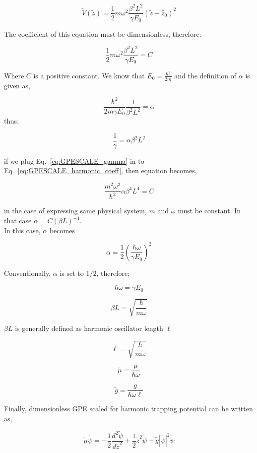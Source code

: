 \documentclass[a4paper,times,hidelinks,12pt]{article}
\begin{document}
\begin{equation}
\label{eq:GPESCALE_harmonic_energy_transform}
    \widetilde{V}(\widetilde{z}) = \frac{1}{2} m\omega^2 \frac{\beta^2 L^2}{\gamma E_0} (\widetilde{z}-\widetilde{z_0})^2  
\end{equation}

The coefficient of this equation must be dimensionless, therefore;

\begin{equation}
\label{eq:GPESCALE_harmonic_coeff}
    \frac{1}{2} m\omega^2 \frac{\beta^2 L^2}{\gamma E_0} = C
\end{equation}

Where $C$ is a positive constant. We know that $E_0 = \frac{\hbar^2}{2m}$ and the definition of $\alpha$ is given as,

\begin{equation}
\label{eq:GPESCALE_alpha}
    \frac{\hbar^2}{2m\gamma E_0} \frac{1}{\beta^2 L^2} = \alpha
\end{equation}
thus;

\begin{equation}
\label{eq:GPESCALE_gamma}
     \frac{1}{\gamma} = \alpha \beta^2 L^2
\end{equation}

if we plug Eq.~\eqref{eq:GPESCALE_gamma} in to Eq.~\eqref{eq:GPESCALE_harmonic_coeff}, then equation becomes,

\begin{equation}
\label{eq:GPESCALE_harmonic_coeff_2}
    \frac{m^2\omega^2}{\hbar^2} \alpha \beta^4 L^4 = C 
\end{equation} 

in the case of expressing same physical system, $m$ and $\omega$ must be constant. In that case $\alpha = C (\beta L)^{-4}$.\\


In this case, $\alpha$ becomes

$$ \alpha =  \frac{1}{2} \left(\frac{\hbar \omega}{\gamma E_0}\right)^2 $$

Conventionally, $\alpha$ is set to $1/2$, therefore;

$$ \hbar \omega = \gamma E_0 $$

$$ \beta L = \sqrt{\frac{\hbar}{m\omega}} $$ 

$ \beta L $ is generally defined as harmonic oscillator length $\ell$

$$ \ell = \sqrt{\frac{\hbar}{m\omega}} $$ 

$$ \widetilde{\mu} = \frac{\mu}{\hbar \omega} $$ 

$$ \widetilde{g} = \frac{g}{\hbar \omega \ell} $$

Finally, dimensionless GPE scaled for harmonic trapping potential can be written as,

$$\widetilde{\mu} \widetilde{\psi} = -\frac{1}{2}\frac{d^2\widetilde{\psi}}{d\widetilde{z}^2} + \frac{1}{2}\widetilde{z}^2\widetilde{\psi} + \widetilde{g}|\widetilde{\psi}|^2 \widetilde{\psi} $$
\end{document}
